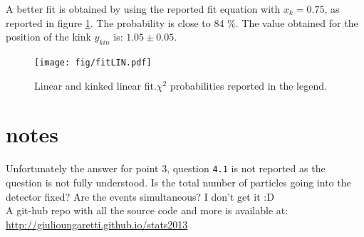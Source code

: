\documentclass[twocolumn]{article}
\begin{document}
		A better fit is obtained by using the reported fit equation with $x_k =0.75$, as reported in figure \ref{fig:fitLIN}. The probability is close to 84 $\%$.
		The value obtained for the position of the kink $y_{kin}$ is: $1.05 \pm 0.05$.
		\begin{figure}[h!]
			\begin{center}
				\texttt{[image: fig/fitLIN.pdf]}
			\end{center}
			\caption{Linear and kinked linear fit.$\chi ^2$ probabilities reported in the legend.}
			\label{fig:fitLIN}
		\end{figure}

\clearpage
\section{notes}
	Unfortunately the answer for point 3, question \texttt{4.1} is not reported as the question is not fully understood.
	Is the total number of particles going into the detector fixed? Are the events simultaneous? I don't get it :D  \\


	A git-hub repo with all the source code and more is available at:
	\url{http://giulioungaretti.github.io/stats2013}
\end{document}
